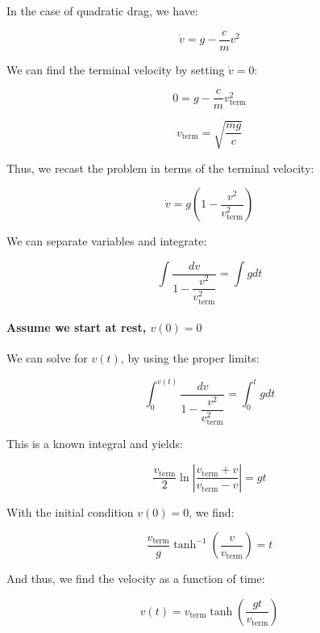 \documentclass[11pt]{article}
\makeatletter
\newcommand{\boxspacing}{\kern\kvtcb@left@rule\kern\kvtcb@boxsep}
\newcommand{\prompt}[4]{
        {\ttfamily\llap{{\color{#2}[#3]:\hspace{3pt}#4}}\vspace{-\baselineskip}}
    }
\makeatother
\begin{document}
In the case of quadratic drag, we have:

\[\dot{v} = g - \dfrac{c}{m}v^2\]

We can find the terminal velocity by setting \(\dot{v} = 0\):

\[0 = g - \dfrac{c}{m}v_{\text{term}}^2\]

\[v_{\text{term}} = \sqrt{\dfrac{mg}{c}}\]

Thus, we recast the problem in terms of the terminal velocity:

\[\dot{v} = g\left(1 - \dfrac{v^2}{v_{\text{term}}^2}\right)\]

We can separate variables and integrate:

\[\int \dfrac{dv}{1 - \dfrac{v^2}{v_{\text{term}}^2}} = \int g dt\]

\paragraph{\texorpdfstring{Assume we start at rest,
\(v(0) = 0\)}{Assume we start at rest, v(0) = 0}}\label{assume-we-start-at-rest-v0-0}

We can solve for \(v(t)\), by using the proper limits:

\[\int_{0}^{v(t)} \dfrac{dv}{1 - \dfrac{v^2}{v_{\text{term}}^2}} = \int_{0}^{t} g dt\]

This is a known integral and yields:

\[\dfrac{v_{\text{term}}}{2}\ln\left|\dfrac{v_{\text{term}} + v}{v_{\text{term}} - v}\right| = gt\]

With the initial condition \(v(0) = 0\), we find:

\[\dfrac{v_{\text{term}}}{g} \tanh^{-1}\left(\dfrac{v}{v_{\text{term}}}\right) = t\]

And thus, we find the velocity as a function of time:

\[v(t) = v_{\text{term}}\tanh\left(\dfrac{gt}{v_{\text{term}}}\right)\]

    \begin{tcolorbox}[breakable, size=fbox, boxrule=1pt, pad at break*=1mm,colback=cellbackground, colframe=cellborder]
\prompt{In}{incolor}{ }{\boxspacing}
\begin{Verbatim}[commandchars=\\\{\}]

\end{Verbatim}
\end{tcolorbox}

    


    
    
    
\end{document}

